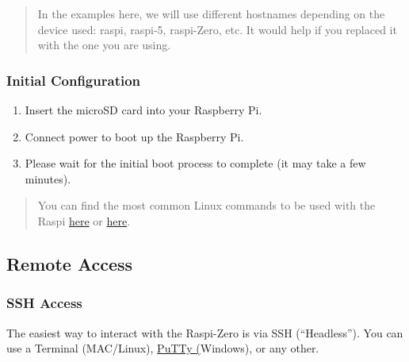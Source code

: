 \documentclass[
]{article}
\providecommand{\tightlist}{%
  \setlength{\itemsep}{0pt}\setlength{\parskip}{0pt}}\usepackage{longtable,booktabs,array}
\begin{document}
\begin{quote}
In the examples here, we will use different hostnames depending on the
device used: raspi, raspi-5, raspi-Zero, etc. It would help if you
replaced it with the one you are using.
\end{quote}

\subsubsection{Initial
Configuration}\label{sec-setup-initial-configuration-c5e1}

\begin{enumerate}
\def\labelenumi{\arabic{enumi}.}
\tightlist
\item
  Insert the microSD card into your Raspberry Pi.
\item
  Connect power to boot up the Raspberry Pi.
\item
  Please wait for the initial boot process to complete (it may take a
  few minutes).
\end{enumerate}

\begin{quote}
You can find the most common Linux commands to be used with the Raspi
\href{https://www.jwdittrich.people.ysu.edu/raspberrypi/UsefulRaspberryPiCommands.pdf}{here}
or
\href{https://www.codecademy.com/learn/learn-raspberry-pi/modules/raspberry-pi-command-line-module/cheatsheet}{here}.
\end{quote}

\subsection{Remote Access}\label{sec-setup-remote-access-1a6a}

\subsubsection{SSH Access}\label{sec-setup-ssh-access-d9fd}

The easiest way to interact with the Raspi-Zero is via SSH
(``Headless''). You can use a Terminal (MAC/Linux),
\href{https://www.putty.org/}{PuTTy (}Windows), or any other.
\end{document}
